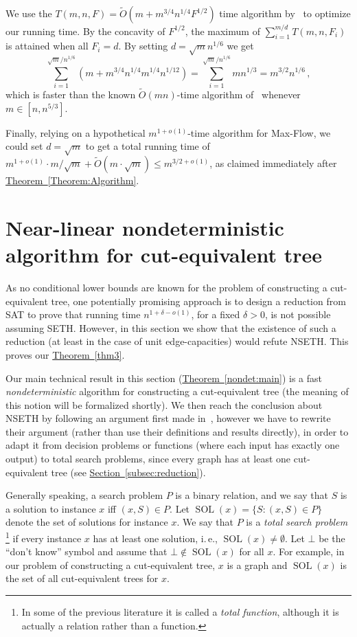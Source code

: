 \documentclass[11pt]{article}
\numberwithin{equation}{section}
\theoremstyle{definition}
\theoremstyle{plain}
\newcommand{\ie}{i.\,e.}
\newcommand{\expref}[2]{\hyperref[#2]{#1~\ref{#2}}}
\theoremstyle{plain}
\newcommand{\ProblemName}[1]{\textsf{#1}}
\newcommand{\MF}{\ProblemName{Max-Flow}\xspace}
\newcommand{\SETH}{SETH\xspace}
\newcommand{\NSETH}{NSETH\xspace}
\DeclareMathOperator{\SOL}{SOL}
\newcommand\tO{\ensuremath{\widetilde O}}  %
\providecommand{\set}[1]{{\{#1\}}}
\begin{document}
We use the $T(m,n,F)=\tO(m+m^{3/4}n^{1/4}F^{1/2})$ time algorithm by~\cite{SidfordT18} to optimize our running time.
By the concavity of $F^{1/2}$, the maximum of $\sum_{i=1}^{m/d}T(m,n,F_i)$ is attained when all $F_i=d$.
By setting $d=\sqrt{m}n^{1/6}$ we get
\[
  \sum_{i=1}^{\sqrt{m}/n^{1/6}} (m+m^{3/4}n^{1/4}m^{1/4}n^{1/12})=
\sum_{i=1}^{\sqrt{m}/n^{1/6}} m n^{1/3}=
m^{3/2}n^{1/6}\,,
\]
which is faster than the known $\tO(mn)$-time algorithm of~\cite{BHKP07} whenever $m\in [n,n^{5/3}]$.

Finally, relying on a hypothetical $m^{1+o(1)}$-time algorithm for \MF,
we could set $d=\sqrt{m}$ to get a total running time of $m^{1+o(1)}\cdot m/\sqrt{m}+\tO(m\cdot \sqrt{m})\leq m^{3/2+o(1)}$, as claimed immediately after \expref{Theorem}{Theorem:Algorithm}.



\section{Near-linear nondeterministic algorithm for cut-equivalent tree}\label{sec:nondet}

As no conditional lower bounds are known
for the problem of constructing a cut-equivalent tree,
one potentially promising approach is to design a reduction from SAT
to prove that running time $n^{1+\delta-o(1)}$, for a fixed $\delta>0$,
is not possible assuming \SETH.
However, in this section we show that the existence of such a reduction (at least in the case of unit edge-capacities) would refute \NSETH.
This proves our \expref{Theorem}{thm3}.


Our main technical result in this section (\expref{Theorem}{nondet:main})
is a fast \emph{nondeterministic} algorithm
for constructing a cut-equivalent tree (the meaning of this notion will be formalized shortly).
We then reach the conclusion about \NSETH
by following an argument first made in~\cite{carmosino2016nondeterministic},
however we have to rewrite their argument
(rather than use their definitions and results directly),
in order to adapt it from decision problems or functions (where each input has exactly one output) to total search problems,
since every graph has at least one cut-equivalent tree (see \expref{Section}{subsec:reduction}).

Generally speaking, a search problem $P$ is a binary relation,
and we say that $S$ is a solution to instance $x$ iff $(x,S)\in P$.
Let $\SOL(x)=\set{S: (x,S)\in P}$ denote the set of solutions for instance $x$.
We say that $P$ is a \emph{total search problem}%
\footnote{In some of the previous literature it is called a
\textit{total function}, although it is actually a relation rather than a function.}
if every instance $x$ has at least one solution, \ie, $\SOL(x)\neq \emptyset$.
Let $\bot$ be the ``don't know'' symbol and assume that $\bot \notin \SOL(x)$ for all $x$.
For example, in our problem of constructing a cut-equivalent tree,
$x$ is a graph and $\SOL(x)$ is the set of all cut-equivalent trees for $x$.
\end{document}
